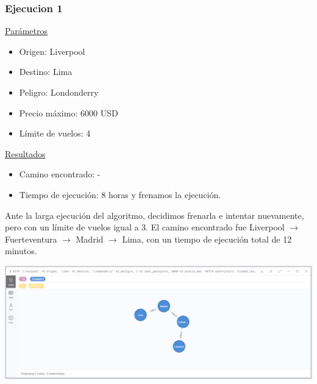 \documentclass[a4paper,11pt]{article}
\begin{document}
\subsubsection*{Ejecucion 1}
\noindent
\underline{Parámetros}
\begin{itemize}
\item Origen: Liverpool
\item Destino: Lima
\item Peligro: Londonderry
\item Precio máximo: 6000 USD
\item Límite de vuelos: 4
\end{itemize}
\underline{Resultados}
\begin{itemize}
\item Camino encontrado: -
\item Tiempo de ejecución: 8 horas y frenamos la ejecución.
\end{itemize}
Ante la larga ejecución del algoritmo, decidimos frenarla e intentar nuevamente, pero con un límite de vuelos igual a 3.
El camino encontrado fue Liverpool $\rightarrow$ Fuerteventura $\rightarrow$ Madrid $\rightarrow$ Lima, con un tiempo de ejecución total de 12 minutos.\\
\begin{center}
\includegraphics[scale=0.40]{./imagenes/consultaB-ejec1.png}
\end{center}
\newpage
\end{document}
